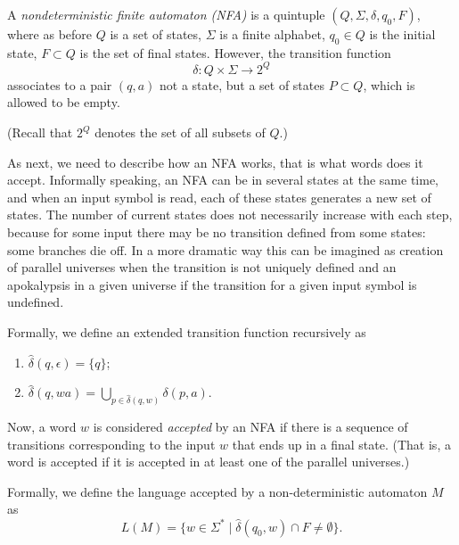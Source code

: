 \begin{page}
\setcounter{section}{1}
\setcounter{subsection}{3}
\setcounter{dfn}{6}
\label{portion:913}

\begin{dfn}
A \emph{nondeterministic finite automaton (NFA)} is a quintuple $(Q, \Sigma, \delta, q_0, F)$, where as before
$Q$ is a set of states, $\Sigma$ is a finite alphabet, $q_0 \in Q$ is the initial state, $F \subset Q$ is the set of final states.
However, the transition function
\[
\delta \colon Q \times \Sigma \to 2^Q
\]
associates to a pair $(q,a)$ not a state, but a set of states $P \subset Q$, which is allowed to be empty.
\end{dfn}

\end{page}

\begin{page}
\setcounter{section}{1}
\setcounter{subsection}{3}
\setcounter{dfn}{6}
\label{portion:914}

(Recall that $2^Q$ denotes the set of all subsets of $Q$.)

As next, we need to describe how an NFA works, that is what words does it accept.
Informally speaking, an NFA can be in several states at the same time, and when an input symbol is read, each of these states generates a new set of states.
The number of current states does not necessarily increase with each step, because for some input there may be no transition defined from some states:
some branches die off.
In a more dramatic way this can be imagined as creation of parallel universes when the transition is not uniquely defined
and an apokalypsis in a given universe if the transition for a given input symbol is undefined.

Formally, we define an extended transition function recursively as
\begin{enumerate}
\item
$\widehat{\delta}(q, \epsilon) = \{q\}$;
\item
$\widehat{\delta}(q, wa) = \bigcup\limits_{p \in \widehat{\delta}(q,w)} \delta(p, a)$.
\end{enumerate}

Now, a word $w$ is considered \emph{accepted} by an NFA if there is a sequence of transitions corresponding to the input $w$
that ends up in a final state.
(That is, a word is accepted if it is accepted in at least one of the parallel universes.)

Formally, we define the language accepted by a non-deterministic automaton $M$ as
\begin{equation}
\label{eqn:NFALanguage}
L(M) = \{w \in \Sigma^* \mid \widehat{\delta}(q_0, w) \cap F \ne \emptyset\}.
\end{equation}


\end{page}

